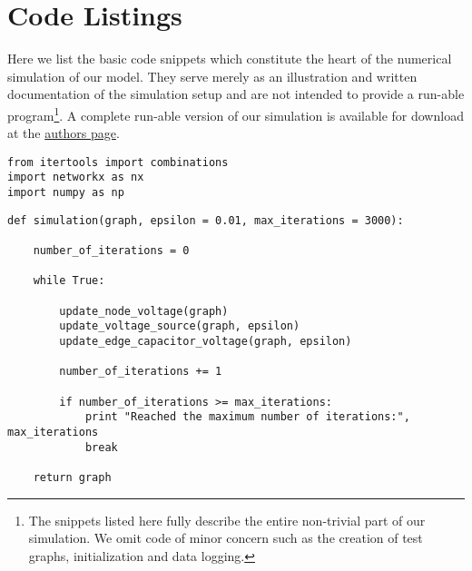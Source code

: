 
\chapter{Code Listings}\label{app:code}

	Here we list the basic code snippets which constitute the heart of the numerical simulation of our model. They serve merely as an illustration and written documentation of the simulation setup and are not intended to provide a run-able program\footnote{The snippets listed here fully describe the entire non-trivial part of our simulation. We omit code of minor concern such as the creation of test graphs, initialization and data logging.}. A complete run-able version of our simulation is available for download at the \href{https://people.mpi-inf.mpg.de/~mtd/}{authors page}.

\begin{codesnippet}
\begin{verbatim}
from itertools import combinations
import networkx as nx
import numpy as np
\end{verbatim}
\label{code:libaries}
\end{codesnippet}


\begin{codesnippet}
\begin{verbatim}
def simulation(graph, epsilon = 0.01, max_iterations = 3000):

	number_of_iterations = 0

	while True:
		
		update_node_voltage(graph)
		update_voltage_source(graph, epsilon)
		update_edge_capacitor_voltage(graph, epsilon)
		
		number_of_iterations += 1	

		if number_of_iterations >= max_iterations:
			print "Reached the maximum number of iterations:", max_iterations
			break

	return graph
\end{verbatim}
\label{code:simulation}
\end{codesnippet}


